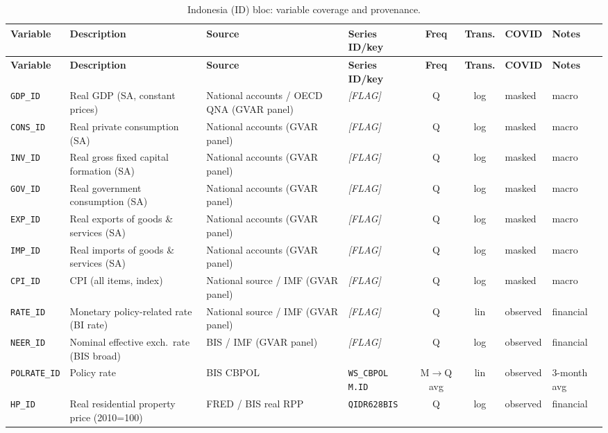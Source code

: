{\footnotesize
\begin{longtable}{@{}llp{2.5cm}p{2.4cm}cclp{2.6cm}@{}}
\caption{Indonesia (ID) bloc: variable coverage and provenance.}\label{tab:data:ID}\\
\toprule
\textbf{Variable} & \textbf{Description} & \textbf{Source} & \textbf{Series ID/key} & \textbf{Freq} & \textbf{Trans.} & \textbf{COVID} & \textbf{Notes} \\
\midrule
\endfirsthead
\toprule
\textbf{Variable} & \textbf{Description} & \textbf{Source} & \textbf{Series ID/key} & \textbf{Freq} & \textbf{Trans.} & \textbf{COVID} & \textbf{Notes} \\
\midrule
\endhead
\bottomrule
\endfoot
\texttt{GDP\_ID}  & Real GDP (SA, constant prices) & National accounts / OECD QNA (GVAR panel) & \textit{[FLAG]} & Q & log & masked & macro \\
\texttt{CONS\_ID} & Real private consumption (SA) & National accounts (GVAR panel) & \textit{[FLAG]} & Q & log & masked & macro \\
\texttt{INV\_ID}  & Real gross fixed capital formation (SA) & National accounts (GVAR panel) & \textit{[FLAG]} & Q & log & masked & macro \\
\texttt{GOV\_ID}  & Real government consumption (SA) & National accounts (GVAR panel) & \textit{[FLAG]} & Q & log & masked & macro \\
\texttt{EXP\_ID}  & Real exports of goods \& services (SA) & National accounts (GVAR panel) & \textit{[FLAG]} & Q & log & masked & macro \\
\texttt{IMP\_ID}  & Real imports of goods \& services (SA) & National accounts (GVAR panel) & \textit{[FLAG]} & Q & log & masked & macro \\
\texttt{CPI\_ID}  & CPI (all items, index) & National source / IMF (GVAR panel) & \textit{[FLAG]} & Q & log & masked & macro \\
\texttt{RATE\_ID} & Monetary policy-related rate (BI rate) & National source / IMF (GVAR panel) & \textit{[FLAG]} & Q & lin & observed & financial \\
\texttt{NEER\_ID} & Nominal effective exch.\ rate (BIS broad) & BIS / IMF (GVAR panel) & \textit{[FLAG]} & Q & log & observed & financial \\
\texttt{POLRATE\_ID} & Policy rate & BIS CBPOL & \texttt{WS\_CBPOL M.ID} & M$\to$Q avg & lin & observed & 3-month avg \\
\texttt{HP\_ID}   & Real residential property price (2010=100) & FRED / BIS real RPP & \texttt{QIDR628BIS} & Q & log & observed & financial \\

\end{longtable}}
